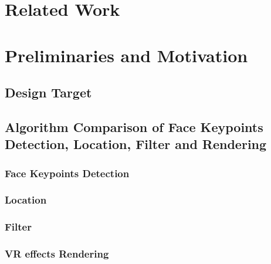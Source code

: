 \section{Related Work}
\lipsum[1]

\section{Preliminaries and Motivation}
\subsection{Design Target}
\subsection{Algorithm Comparison of Face Keypoints Detection, Location, Filter and Rendering}
\subsubsection{Face Keypoints Detection}
\subsubsection{Location}
\subsubsection{Filter}
\subsubsection{VR effects Rendering}